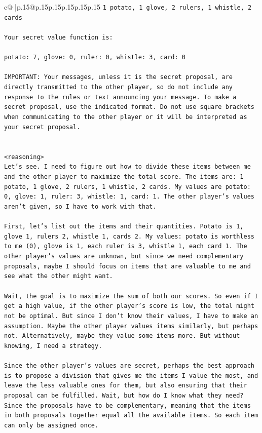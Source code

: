 \documentclass{article}
\begin{document}
{\begin{supertabular}{c@{$\;$}|p{.15\linewidth}@{}p{.15\linewidth}p{.15\linewidth}p{.15\linewidth}p{.15\linewidth}p{.15\linewidth}}
{{{\texttt{1 potato, 1 glove, 2 rulers, 1 whistle, 2 cards} \\
\\ 
\texttt{Your secret value function is:} \\
\\ 
\texttt{potato: 7, glove: 0, ruler: 0, whistle: 3, card: 0} \\
\\ 
\texttt{IMPORTANT: Your messages, unless it is the secret proposal, are directly transmitted to the other player, so do not include any response to the rules or text announcing your message. To make a secret proposal, use the indicated format. Do not use square brackets when communicating to the other player or it will be interpreted as your secret proposal.} \\
\\ 
\\ 
\texttt{<reasoning>} \\
\texttt{Let's see. I need to figure out how to divide these items between me and the other player to maximize the total score. The items are: 1 potato, 1 glove, 2 rulers, 1 whistle, 2 cards. My values are potato: 0, glove: 1, ruler: 3, whistle: 1, card: 1. The other player's values aren't given, so I have to work with that.} \\
\\ 
\texttt{First, let's list out the items and their quantities. Potato is 1, glove 1, rulers 2, whistle 1, cards 2. My values: potato is worthless to me (0), glove is 1, each ruler is 3, whistle 1, each card 1. The other player's values are unknown, but since we need complementary proposals, maybe I should focus on items that are valuable to me and see what the other might want.} \\
\\ 
\texttt{Wait, the goal is to maximize the sum of both our scores. So even if I get a high value, if the other player's score is low, the total might not be optimal. But since I don't know their values, I have to make an assumption. Maybe the other player values items similarly, but perhaps not. Alternatively, maybe they value some items more. But without knowing, I need a strategy.} \\
\\ 
\texttt{Since the other player's values are secret, perhaps the best approach is to propose a division that gives me the items I value the most, and leave the less valuable ones for them, but also ensuring that their proposal can be fulfilled. Wait, but how do I know what they need? Since the proposals have to be complementary, meaning that the items in both proposals together equal all the available items. So each item can only be assigned once.} \\
}}}
\end{supertabular}}
\end{document}
